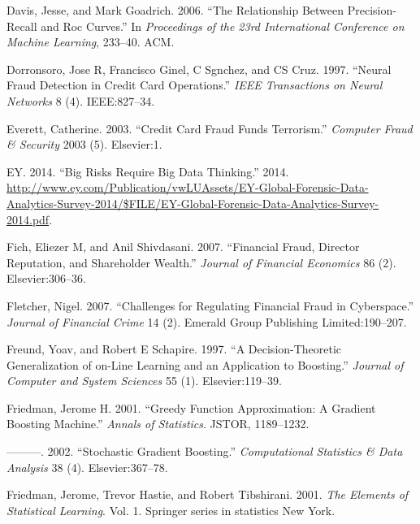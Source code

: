\documentclass[12pt,]{article}
\begin{document}
\leavevmode\hypertarget{ref-davis2006relationship}{}%
Davis, Jesse, and Mark Goadrich. 2006. ``The Relationship Between
Precision-Recall and Roc Curves.'' In \emph{Proceedings of the 23rd
International Conference on Machine Learning}, 233--40. ACM.

\leavevmode\hypertarget{ref-dorronsoro1997neural}{}%
Dorronsoro, Jose R, Francisco Ginel, C Sgnchez, and CS Cruz. 1997.
``Neural Fraud Detection in Credit Card Operations.'' \emph{IEEE
Transactions on Neural Networks} 8 (4). IEEE:827--34.

\leavevmode\hypertarget{ref-everett2003credit}{}%
Everett, Catherine. 2003. ``Credit Card Fraud Funds Terrorism.''
\emph{Computer Fraud \& Security} 2003 (5). Elsevier:1.

\leavevmode\hypertarget{ref-analytics_tools_table}{}%
EY. 2014. ``Big Risks Require Big Data Thinking.'' 2014.
\url{http://www.ey.com/Publication/vwLUAssets/EY-Global-Forensic-Data-Analytics-Survey-2014/$FILE/EY-Global-Forensic-Data-Analytics-Survey-2014.pdf}.

\leavevmode\hypertarget{ref-fich2007financial}{}%
Fich, Eliezer M, and Anil Shivdasani. 2007. ``Financial Fraud, Director
Reputation, and Shareholder Wealth.'' \emph{Journal of Financial
Economics} 86 (2). Elsevier:306--36.

\leavevmode\hypertarget{ref-fletcher2007challenges}{}%
Fletcher, Nigel. 2007. ``Challenges for Regulating Financial Fraud in
Cyberspace.'' \emph{Journal of Financial Crime} 14 (2). Emerald Group
Publishing Limited:190--207.

\leavevmode\hypertarget{ref-freund1997decision}{}%
Freund, Yoav, and Robert E Schapire. 1997. ``A Decision-Theoretic
Generalization of on-Line Learning and an Application to Boosting.''
\emph{Journal of Computer and System Sciences} 55 (1). Elsevier:119--39.

\leavevmode\hypertarget{ref-friedman2001greedy}{}%
Friedman, Jerome H. 2001. ``Greedy Function Approximation: A Gradient
Boosting Machine.'' \emph{Annals of Statistics}. JSTOR, 1189--1232.

\leavevmode\hypertarget{ref-friedman2002stochastic}{}%
---------. 2002. ``Stochastic Gradient Boosting.'' \emph{Computational
Statistics \& Data Analysis} 38 (4). Elsevier:367--78.

\leavevmode\hypertarget{ref-friedman2001elements}{}%
Friedman, Jerome, Trevor Hastie, and Robert Tibshirani. 2001. \emph{The
Elements of Statistical Learning}. Vol. 1. Springer series in statistics
New York.
\end{document}
